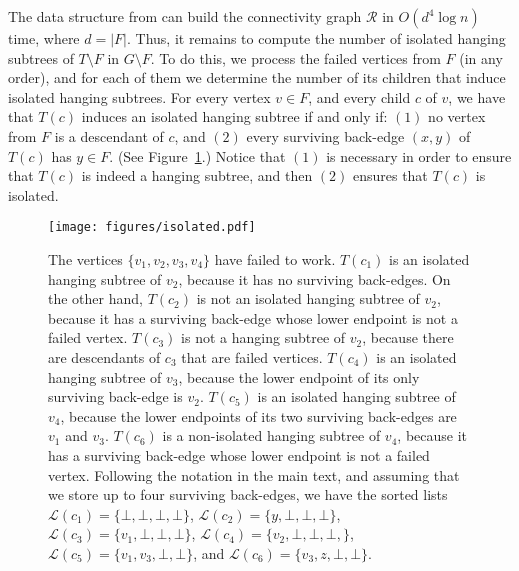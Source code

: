 \documentclass[11pt,a4paper]{article}
\begin{document}
The data structure from \cite{DBLP:conf/esa/Kosinas23} can build the connectivity graph $\mathcal{R}$ in $O(d^4\log{n})$ time, where $d=|F|$. Thus, it remains to compute the number of isolated hanging subtrees of $T\setminus F$ in $G\setminus F$. To do this, we process the failed vertices from $F$ (in any order), and for each of them we determine the number of its children that induce isolated hanging subtrees. For every vertex $v\in F$, and every child $c$ of $v$, we have that $T(c)$ induces an isolated hanging subtree if and only if: $(1)$ no vertex from $F$ is a descendant of $c$, and $(2)$ every surviving back-edge $(x,y)$ of $T(c)$ has $y\in F$. (See Figure~\ref{figure:isolated}.) Notice that $(1)$ is necessary in order to ensure that $T(c)$ is indeed a hanging subtree, and then $(2)$ ensures that $T(c)$ is isolated.

\begin{figure}[h!]\centering
\texttt{[image: figures/isolated.pdf]}
\caption{\small{The vertices $\{v_1,v_2,v_3,v_4\}$ have failed to work. $T(c_1)$ is an isolated hanging subtree of $v_2$, because it has no surviving back-edges. On the other hand, $T(c_2)$ is not an isolated hanging subtree of $v_2$, because it has a surviving back-edge whose lower endpoint is not a failed vertex. $T(c_3)$ is not a hanging subtree of $v_2$, because there are descendants of $c_3$ that are failed vertices. $T(c_4)$ is an isolated hanging subtree of $v_3$, because the lower endpoint of its only surviving back-edge is $v_2$. $T(c_5)$ is an isolated hanging subtree of $v_4$, because the lower endpoints of its two surviving back-edges are $v_1$ and $v_3$. $T(c_6)$ is a non-isolated hanging subtree of $v_4$, because it has a surviving back-edge whose lower endpoint is not a failed vertex. Following the notation in the main text, and assuming that we store up to four surviving back-edges, we have the sorted lists $\mathcal{L}(c_1)=\{\bot,\bot,\bot,\bot\}$, $\mathcal{L}(c_2)=\{y,\bot,\bot,\bot\}$, $\mathcal{L}(c_3)=\{v_1,\bot,\bot,\bot\}$, $\mathcal{L}(c_4)=\{v_2,\bot,\bot,\bot,\}$, $\mathcal{L}(c_5)=\{v_1,v_3,\bot,\bot\}$, and $\mathcal{L}(c_6)=\{v_3,z,\bot,\bot\}$.}}\label{figure:isolated}
\end{figure}
\end{document}
